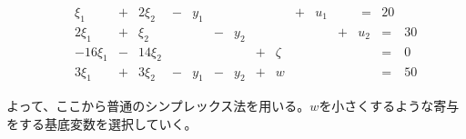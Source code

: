 \documentclass[dvipdfmx,titlepage, a4paper]{jsarticle}%
\begin{document}
\begin{eqnarray*}
	&&\begin{array}{cccccccccccccccc}
		\xi_{1} & + & 2\xi_{2} & - & y_{1} & \; & \; & \; & \; & + & u_{1} & \; & \; = & 20\\
		2\xi_{1} & + & \xi_{2} & \; & \; & - & y_{2} & \; & \; & \; & \; & + & u_{2} & = & 30\\
		-16\xi_{1} & - & 14\xi_{2} & \; & \; & \; & \; & + & \zeta & \; & \; & \; & \; & = & 0\\
		3\xi_{1} & + & 3\xi_{2} & - & y_{1} & - & y_{2} & + & w & \; & \; & \; & \; & = & 50\\
	\end{array}\\
\end{eqnarray*}
よって、ここから普通のシンプレックス法を用いる。$w$を小さくするような寄与をする基底変数を選択していく。
\end{document}
